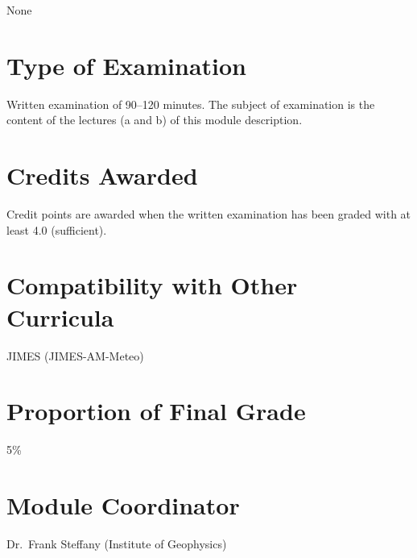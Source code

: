 \documentclass[
  letterpaper,
  10pt,
  openany]{book}
\begin{document}

None

\section*{Type of Examination}\label{type-of-examination-4}


Written examination of 90--120 minutes. The subject of examination is
the content of the lectures (a and b) of this module description.

\section*{Credits Awarded}\label{credits-awarded-4}


Credit points are awarded when the written examination has been graded
with at least 4.0 (sufficient).

\section*{Compatibility with Other
Curricula}\label{compatibility-with-other-curricula-4}


JIMES (JIMES-AM-Meteo)

\section*{Proportion of Final Grade}\label{proportion-of-final-grade-4}


5\%

\section*{Module Coordinator}\label{module-coordinator-4}


Dr.~Frank Steffany (Institute of Geophysics)
\end{document}
